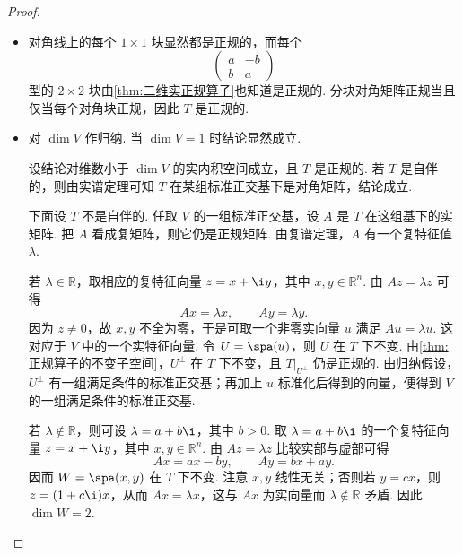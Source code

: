 \begin{proof}
    \begin{itemize}
        \item[(2) $ \Rightarrow $ (1)] 对角线上的每个 $ 1 \times 1 $ 块显然都是正规的，而每个
        \[
            \begin{pmatrix}
                a & -b \\
                b & a
            \end{pmatrix}
        \]
        型的 $ 2 \times 2 $ 块由\autoref{thm:二维实正规算子}也知道是正规的. 分块对角矩阵正规当且仅当每个对角块正规，因此 $ T $ 是正规的.

        \item[(1) $ \Rightarrow $ (2)] 对 $ \dim V $ 作归纳. 当 $ \dim V = 1 $ 时结论显然成立.

        设结论对维数小于 $ \dim V $ 的实内积空间成立，且 $ T $ 是正规的. 若 $ T $ 是自伴的，则由实谱定理可知 $ T $ 在某组标准正交基下是对角矩阵，结论成立.

        下面设 $ T $ 不是自伴的. 任取 $ V $ 的一组标准正交基，设 $ A $ 是 $ T $ 在这组基下的实矩阵. 把 $ A $ 看成复矩阵，则它仍是正规矩阵. 由复谱定理，$ A $ 有一个复特征值 $ \lambda $.

        若 $ \lambda \in \mathbb{R} $，取相应的复特征向量 $ z = x + \i y $，其中 $ x, y \in \mathbb{R}^n $. 由 $A z = \lambda z$ 可得
        \[
            A x = \lambda x, \qquad A y = \lambda y.
        \]
        因为 $ z \neq 0 $，故 $ x, y $ 不全为零，于是可取一个非零实向量 $ u $ 满足 $ A u = \lambda u $. 这对应于 $ V $ 中的一个实特征向量. 令 $ U = \spa(u) $，则 $ U $ 在 $ T $ 下不变. 由\autoref{thm:正规算子的不变子空间}，$ U^\perp $ 在 $ T $ 下不变，且 $ T|_{U^\perp} $ 仍是正规的. 由归纳假设，$ U^\perp $ 有一组满足条件的标准正交基；再加上 $ u $ 标准化后得到的向量，便得到 $ V $ 的一组满足条件的标准正交基.

        若 $ \lambda \notin \mathbb{R} $，则可设 $ \lambda = a + b\i $，其中 $ b > 0 $. 取 $ \lambda = a + b\i $ 的一个复特征向量 $ z = x + \i y $，其中 $ x, y \in \mathbb{R}^n $. 由 $ A z = \lambda z $ 比较实部与虚部可得
        \[
            A x = a x - b y, \qquad A y = b x + a y.
        \]
        因而 $ W = \spa(x, y) $ 在 $ T $ 下不变. 注意 $ x, y $ 线性无关；否则若 $ y = c x $，则 $ z = (1 + c\i)x $，从而 $ A x = \lambda x $，这与 $ A x $ 为实向量而 $ \lambda \notin \mathbb{R} $ 矛盾. 因此 $ \dim W = 2 $.


\end{itemize}
\end{proof}
